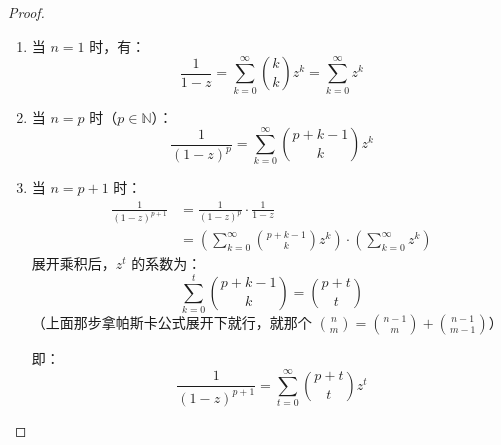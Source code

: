 \documentclass[oneside]{book}
\theoremstyle{definition}
\begin{document}
\begin{proof}
	\begin{enumerate}
		\item 当 \( n = 1 \) 时，有：
		\[
		\frac{1}{1-z} = \sum_{k=0}^{\infty} \binom{k}{k} z^k = \sum_{k=0}^{\infty} z^k
		\]
		
		\item 当 \( n = p \) 时（\( p \in \mathbb{N} \)）：
		\[
		\frac{1}{(1-z)^p} = \sum_{k=0}^{\infty} \binom{p+k-1}{k} z^k
		\]
		
		
		\item 当 \( n = p+1 \) 时：
		\[
		\begin{aligned}
			\frac{1}{(1-z)^{p+1}} &= \frac{1}{(1-z)^p} \cdot \frac{1}{1-z} \\
			&= \left( \sum_{k=0}^{\infty} \binom{p+k-1}{k} z^k \right) \cdot \left( \sum_{k=0}^{\infty} z^k \right)
		\end{aligned}
		\]
		展开乘积后，\( z^t \) 的系数为：
		\[
		\sum_{k=0}^{t} \binom{p+k-1}{k} = \binom{p+t}{t}
		\]
		（上面那步拿帕斯卡公式展开下就行，就那个 \(\binom{n}{m}=\binom{n-1}{m}+\binom{n-1}{m-1}\)）
		
		即：
		\[
		\frac{1}{(1-z)^{p+1}} = \sum_{t=0}^{\infty} \binom{p+t}{t} z^t
		\]
	\end{enumerate}
\end{proof}
\end{document}
